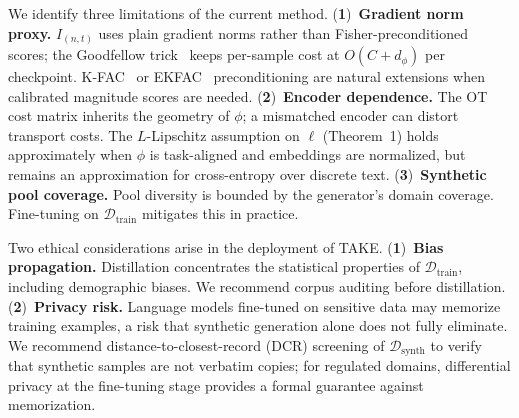 \begin{foldable} %
  We identify three limitations of the current method.
  (\textbf{1})~\textbf{Gradient norm proxy.}
  $I_{(n,t)}$ uses plain gradient norms rather than Fisher-preconditioned scores; the Goodfellow trick~\cite{goodfellow2015efficient} keeps per-sample cost at $O(C + d_\phi)$ per checkpoint.
  K-FAC~\cite{martens2015optimizing} or EKFAC~\cite{george2018fast} preconditioning are natural extensions when calibrated magnitude scores are needed.
  (\textbf{2})~\textbf{Encoder dependence.}
  The OT cost matrix inherits the geometry of $\phi$; a mismatched encoder can distort transport costs.
  The $L$-Lipschitz assumption on $\ell$ (Theorem~1) holds approximately when $\phi$ is task-aligned and embeddings are normalized, but remains an approximation for cross-entropy over discrete text.
  (\textbf{3})~\textbf{Synthetic pool coverage.}
  Pool diversity is bounded by the generator's domain coverage.
  Fine-tuning on $\mathcal{D}_\text{train}$ mitigates this in practice.
\end{foldable}

\begin{foldable} %
  Two ethical considerations arise in the deployment of TAKE.
  (\textbf{1})~\textbf{Bias propagation.}
  Distillation concentrates the statistical properties of $\mathcal{D}_\text{train}$, including demographic biases.
  We recommend corpus auditing before distillation.
  (\textbf{2})~\textbf{Privacy risk.}
  Language models fine-tuned on sensitive data may memorize training examples, a risk that synthetic generation alone does not fully eliminate.
  We recommend distance-to-closest-record (DCR) screening of $\mathcal{D}_\text{synth}$ to verify that synthetic samples are not verbatim copies; for regulated domains, differential privacy at the fine-tuning stage provides a formal guarantee against memorization.
\end{foldable}
